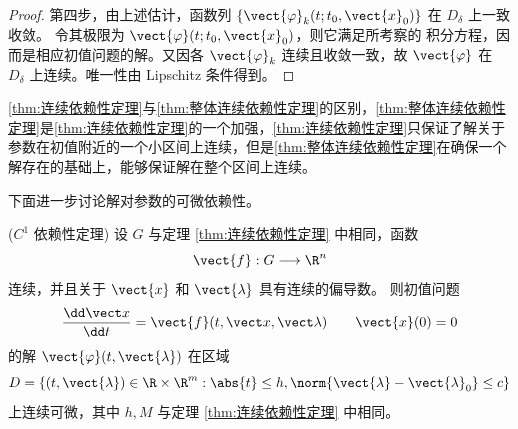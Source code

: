 \begin{proof}
	第四步，由上述估计，函数列
	$\{\vect{\varphi}_k(t;t_0,\vect{x}_0)\}$ 在 $D_\delta$ 上一致收敛。
	令其极限为 $\vect{\varphi}(t;t_0,\vect{x}_0)$，则它满足所考察的
	积分方程，因而是相应初值问题的解。又因各
	$\vect{\varphi}_k$ 连续且收敛一致，故
	$\vect{\varphi}$ 在 $D_\delta$ 上连续。唯一性由 Lipschitz 条件得到。
\end{proof}
\ref{thm:连续依赖性定理}与\ref{thm:整体连续依赖性定理}的区别，\ref{thm:整体连续依赖性定理}是\ref{thm:连续依赖性定理}的一个加强，\ref{thm:连续依赖性定理}只保证了解关于参数在初值附近的一个小区间上连续，但是\ref{thm:整体连续依赖性定理}在确保一个解存在的基础上，能够保证解在整个区间上连续。

下面进一步讨论解对参数的可微依赖性。

\begin{theorem}($C^1$ 依赖性定理)\label{thm:C1依赖性定理}
	设 $G$ 与定理 \ref{thm:连续依赖性定理} 中相同，函数
	\[
		\vect{f}:G\longrightarrow\R^n
	\]
	连续，并且关于 $\vect{x}$ 和 $\vect{\lambda}$ 具有连续的偏导数。
	则初值问题
	\[\frac{\dd \vect x}{\dd t}=\vect{f}(t,\vect x,\vect\lambda)\qquad \vect{x}(0)=0\]
	的解 $\vect{\varphi}(t,\vect{\lambda})$ 在区域
	\[
		D=\left\{
		(t,\vect{\lambda})\in\R\times\R^m:
		\abs{t}\leq h,
		\norm{\vect{\lambda}-\vect{\lambda}_0}\leq c
		\right\}
	\]
	上连续可微，其中 $h,M$ 与定理 \ref{thm:连续依赖性定理} 中相同。
\end{theorem}

